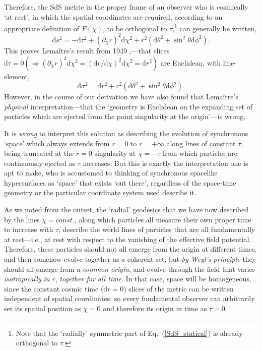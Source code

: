 \documentclass[11pt]{article}
\begin{document}
\begin{appendix}
Therefore, the SdS metric in the proper frame of an observer who is cosmically `at rest', in which the spatial coordinates are required, according to an appropriate definition of $F(\chi)$, to be orthogonal to $\tau$,\footnote{Note that the `radially' symmetric part of Eq.~(\ref{SdS_statical}) is already orthogonal to $\tau$.} can generally be written,
\begin{equation}
\mathrm{d}s^2=-\mathrm{d}\tau^2+\left(\partial_{\chi}r\right)^2\mathrm{d}\chi^2+r^2\left(\mathrm{d}\theta^2+\sin^2\theta{\mathrm{d}\phi}^2\right).\label{SdS_proper}
\end{equation}
This proves Lema\^{i}tre's result from 1949 \cite{Lemaitre1949},---that slices $\mathrm{d}\tau=0\left(\Rightarrow\left(\partial_{\chi}r\right)^2\mathrm{d}\chi^2=\left(\mathrm{d}r/\mathrm{d}\chi\right)^2\mathrm{d}\chi^2=\mathrm{d}r^2\right)$ are Euclidean, with line-element,
\begin{equation}
\mathrm{d}\sigma^2=\mathrm{d}r^2+r^2\left(\mathrm{d}\theta^2+\sin^2\theta{\mathrm{d}\phi}^2\right).
\end{equation}
However, in the course of our derivation we have also found that Lema\^{i}tre's \textit{physical} interpretation---that the `geometry is Euclidean on the expanding set of particles which are ejected from the point singularity at the origin'---is wrong. 

It is \textit{wrong} to interpret this solution as describing the evolution of synchronous `space' which always extends from $r=0$ to $r=+\infty$ along lines of constant $\tau$, being truncated at the $r=0$ singularity at $\chi=-\tau$ from which particles are continuously ejected as $\tau$ increases. But this is exactly the interpretation one is apt to make, who is accustomed to thinking of synchronous spacelike hypersurfaces as `space' that exists `out there', regardless of the space-time geometry or the particular coordinate system used describe it.

As we noted from the outset, the `radial' geodesics that we have now described by the lines $\chi=const.$, along which particles all measure their own proper time to increase with $\tau$, describe the world lines of particles that are all fundamentally at rest---i.e., at rest with respect to the vanishing of the effective field potential. Therefore, these particles should not all emerge from the origin at different times, and then somehow evolve together as a coherent set; but \textit{by Weyl's principle} they should all emerge from a \textit{common origin}, and evolve through the field that varies \textit{isotropically in} $r$, \textit{together for all time}. In that case, space will be homogeneous, since the constant cosmic time ($\mathrm{d}r=0$) slices of the metric can be written independent of spatial coordinates; so every fundamental observer can arbitrarily set its spatial position as $\chi=0$ and therefore its origin in time as $\tau=0$.


\end{appendix}
\end{document}
